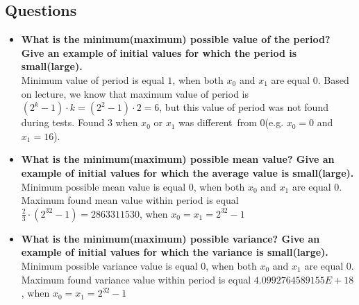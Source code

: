 \documentclass[a4paper,10pt]{article}
\begin{document}
\subsection{Questions}
\begin{itemize}
 \item \textbf{What is the minimum(maximum) possible value of the period? Give an example of initial values for which the period is small(large).} \\
Minimum value of period is equal $1$, when both $x_0$ and $x_1$ are equal $0$. Based on lecture, we know that maximum value of period is
$( 2^k - 1 ) \cdot k = ( 2^2 - 1) \cdot 2 = 6$, but this value of period was not found during tests. Found $3$ when $x_0$ or $x_1$ was different from 0(e.g. $x_0 = 0$ and $x_1 = 16$).

 \item \textbf{What is the minimum(maximum) possible mean value? Give an example of initial values for which the average value is small(large).} \\
Minimum possible mean value is equal $0$, when both $x_0$ and $x_1$ are equal $0$. Maximum found mean value within period is equal $\frac{2}{3} \cdot (2^{32} - 1) = 2863311530$, when $x_0 = x_1 = 2^{32} -1$

 \item \textbf{What is the minimum(maximum) possible variance? Give an example of initial values for which the variance is small(large).} \\
Minimum possible variance value is equal $0$, when both $x_0$ and $x_1$ are equal $0$. Maximum found variance value within period is equal $4.0992764589155E+18$, when $x_0 = x_1 = 2^{32} -1$


\end{itemize}
\end{document}
